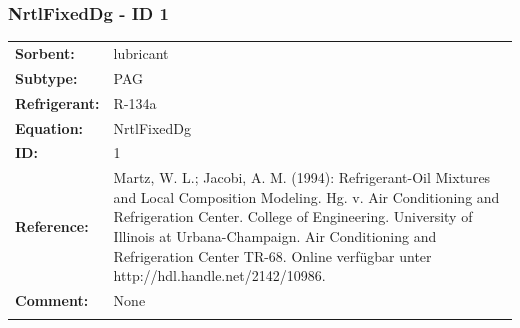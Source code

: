 \subsubsection{NrtlFixedDg - ID 1}
%
\begin{tabular}[l]{|lp{11.5cm}|}
\hline
\addlinespace

\textbf{Sorbent:} & lubricant \\
\textbf{Subtype:} & PAG \\
\textbf{Refrigerant:} & R-134a \\
\textbf{Equation:} & NrtlFixedDg \\
\textbf{ID:} & 1 \\
\textbf{Reference:} & Martz, W. L.; Jacobi, A. M. (1994): Refrigerant-Oil Mixtures and Local Composition Modeling. Hg. v. Air Conditioning and Refrigeration Center. College of Engineering. University of Illinois at Urbana-Champaign. Air Conditioning and Refrigeration Center TR-68. Online verfügbar unter http://hdl.handle.net/2142/10986. \\
\textbf{Comment:} & None \\

\addlinespace
\hline
\end{tabular}
\newline

